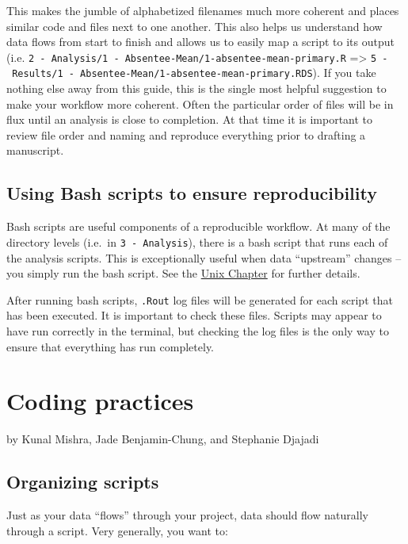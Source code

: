 \documentclass[]{book}
\begin{document}
This makes the jumble of alphabetized filenames much more coherent and
places similar code and files next to one another. This also helps us
understand how data flows from start to finish and allows us to easily
map a script to its output (i.e.
\texttt{2\ -\ Analysis/1\ -\ Absentee-Mean/1-absentee-mean-primary.R}
=\textgreater{}
\texttt{5\ -\ Results/1\ -\ Absentee-Mean/1-absentee-mean-primary.RDS}).
If you take nothing else away from this guide, this is the single most
helpful suggestion to make your workflow more coherent. Often the
particular order of files will be in flux until an analysis is close to
completion. At that time it is important to review file order and naming
and reproduce everything prior to drafting a manuscript.

\section{Using Bash scripts to ensure
reproducibility}\label{using-bash-scripts-to-ensure-reproducibility}

Bash scripts are useful components of a reproducible workflow. At many
of the directory levels (i.e.~in \texttt{3\ -\ Analysis}), there is a
bash script that runs each of the analysis scripts. This is
exceptionally useful when data ``upstream'' changes -- you simply run
the bash script. See the \protect\hyperlink{unix}{Unix Chapter} for
further details.

After running bash scripts, \texttt{.Rout} log files will be generated
for each script that has been executed. It is important to check these
files. Scripts may appear to have run correctly in the terminal, but
checking the log files is the only way to ensure that everything has run
completely.

\chapter{Coding practices}\label{coding-practices}

by Kunal Mishra, Jade Benjamin-Chung, and Stephanie Djajadi

\section{Organizing scripts}\label{organizing-scripts}

Just as your data ``flows'' through your project, data should flow
naturally through a script. Very generally, you want to:
\end{document}
